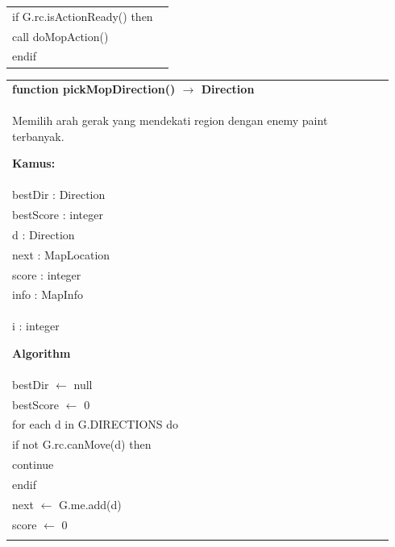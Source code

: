 \documentclass{article}
\newenvironment{pseudobox}
{
\centering
\begin{longtable}{|p{0.94\linewidth}|}
\hline
}
{
\\ \hline
\end{longtable}
\vspace{0.05cm}
}
\begin{document}
\begin{pseudobox}
\hspace*{1em} if G.rc.isActionReady() then \\
\hspace*{2em} call doMopAction() \\
\hspace*{1em} endif
\end{pseudobox}

\begin{pseudobox}
\textbf{function pickMopDirection() $\rightarrow$ Direction} \\
{ Memilih arah gerak yang mendekati region dengan enemy paint terbanyak. }

\textbf{Kamus:} \\
\hspace*{1em} bestDir : Direction \\
\hspace*{1em} bestScore : integer \\
\hspace*{1em} d : Direction \\
\hspace*{1em} next : MapLocation \\
\hspace*{1em} score : integer \\
\hspace*{1em} info : MapInfo \\
\hspace*{1em} i : integer

\textbf{Algorithm} \\
\hspace*{1em} bestDir $\leftarrow$ null \\
\hspace*{1em} bestScore $\leftarrow$ 0 \\

\hspace*{1em} for each d in G.DIRECTIONS do \\
\hspace*{2em} if not G.rc.canMove(d) then \\
\hspace*{3em} continue \\
\hspace*{2em} endif \\

\hspace*{2em} next $\leftarrow$ G.me.add(d) \\
\hspace*{2em} score $\leftarrow$ 0 \\


\end{pseudobox}
\end{document}

